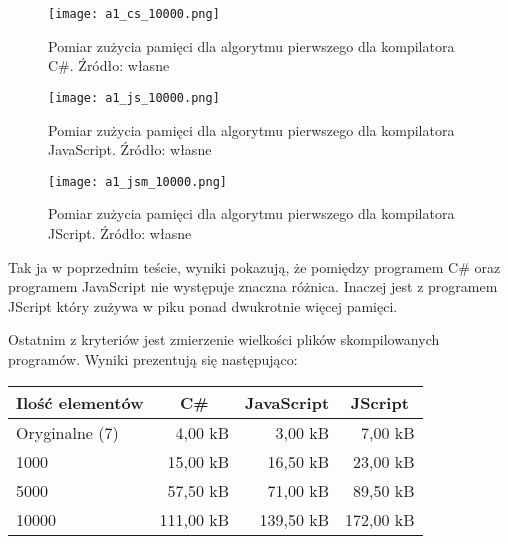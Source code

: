 \begin{figure}[!h]
  \centering
  \texttt{[image: a1\_cs\_10000.png]}
  \caption{Pomiar zużycia pamięci dla algorytmu pierwszego dla kompilatora C\#. Źródło: własne}
  \label{fig:a}
\end{figure}

\begin{figure}[!h]
  \centering
  \texttt{[image: a1\_js\_10000.png]}
  \caption{Pomiar zużycia pamięci dla algorytmu pierwszego dla kompilatora JavaScript. Źródło: własne}
  \label{fig:a}
\end{figure}

\begin{figure}[!h]
  \centering
  \texttt{[image: a1\_jsm\_10000.png]}
  \caption{Pomiar zużycia pamięci dla algorytmu pierwszego dla kompilatora JScript. Źródło: własne}
  \label{fig:a}
\end{figure}

\newpage
\par Tak ja w poprzednim teście, wyniki pokazują, że pomiędzy programem C\# oraz programem JavaScript nie występuje znaczna różnica. Inaczej jest z programem JScript który zużywa w piku ponad dwukrotnie więcej pamięci.

\newpage
\par Ostatnim z kryteriów jest zmierzenie wielkości plików skompilowanych programów. Wyniki prezentują się następująco:

\begin{table}[h!]
  \centering
  \begin{tabular}{|l|r|r|r|}
  \hline
  \multicolumn{1}{|c|}{Ilość elementów} & \multicolumn{1}{|c|}{C\#} & \multicolumn{1}{|c|}{JavaScript}& \multicolumn{1}{|c|}{JScript} \\ \hline
  Oryginalne (7)  & 4,00 kB & 3,00 kB & 7,00 kB \\ \hline
  1000            & 15,00 kB & 16,50 kB & 23,00 kB \\ \hline
  5000            & 57,50 kB & 71,00 kB & 89,50 kB \\ \hline
  10000           & 111,00 kB & 139,50 kB & 172,00 kB \\ \hline
  \end{tabular}
\end{table}


